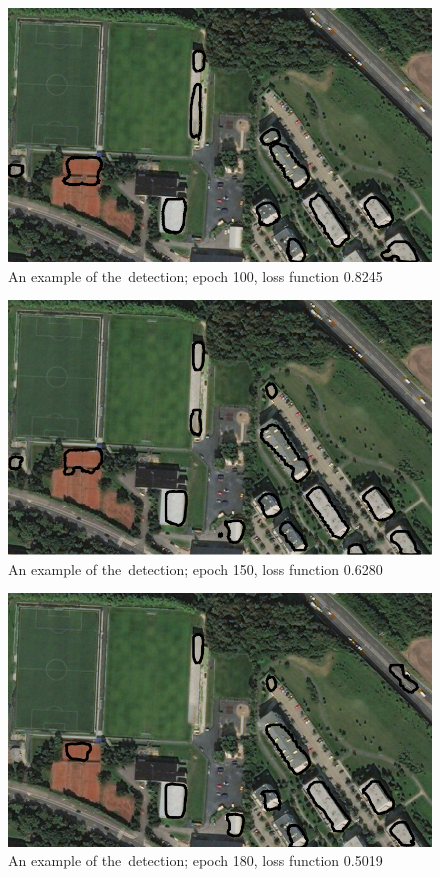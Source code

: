 \begin{figure}[H]
   \centering
	\includegraphics[width=.9\linewidth]{./pictures/out_b_100.png}
	\caption[Detection of buildings, example]{An example of the~detection; epoch
	100, loss function 0.8245}
      \label{fig:build-5}
\end{figure}

\begin{figure}[H]
   \centering
	\includegraphics[width=.9\linewidth]{./pictures/out_b_150.png}
	\caption[Detection of buildings, example]{An example of the~detection; epoch
	150, loss function 0.6280}
      \label{fig:build-6}
\end{figure}

\begin{figure}[H]
   \centering
	\includegraphics[width=.9\linewidth]{./pictures/out_b_180.png}
	\caption[Detection of buildings, example]{An example of the~detection; epoch
	180, loss function 0.5019}
      \label{fig:build-1}
\end{figure}

